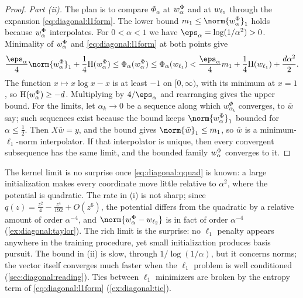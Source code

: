 \begin{refsection}
\begin{proof}
\emph{Part (ii).} The plan is to compare $\Phi_\alpha$ at $w^\Phi_\alpha$ and at $w_{\ell_{1}}$ through the expansion \eqref{eq:diagonal:l1form}. The lower bound $m_1\le\norm{\diagwphi}_1$ holds because $w^\Phi_\alpha$ interpolates. For $0<\alpha<1$ we have $\eps_\alpha=\log(1/\alpha^2)>0$. Minimality of $w^\Phi_\alpha$ and \eqref{eq:diagonal:l1form} at both points give
\[
  \frac{\eps_\alpha}4\norm{\diagwphi}_1+\frac14\diagH(\diagwphi)\le\Phi_\alpha(\diagwphi)\le\Phi_\alpha(\diagwl1)<\frac{\eps_\alpha}4m_1+\frac14\diagH(\diagwl1)+\frac{d\alpha^2}2 .
\]
The function $x\mapsto x\log x-x$ is at least $-1$ on $[0,\infty)$, with its minimum at $x=1$, so $\mathrm{H}(w^\Phi_\alpha)\ge-d$. Multiplying by $4/\eps_\alpha$ and rearranging gives the upper bound. For the limits, let $\alpha_k\to0$ be a sequence along which $w^\Phi_{\alpha_k}$ converges, to $\bar w$ say; such sequences exist because the bound keeps $\norm{\diagwphi}_1$ bounded for $\alpha\le\frac12$. Then $X\bar w=y$, and the bound gives $\norm{\bar w}_1\le m_1$, so $\bar w$ is a minimum-$\ell_1$-norm interpolator. If that interpolator is unique, then every convergent subsequence has the same limit, and the bounded family $w^\Phi_\alpha$ converges to it.
\end{proof}

The kernel limit is no surprise once \eqref{eq:diagonal:qquad} is known: a large initialization makes every coordinate move little relative to $\alpha^2$, where the potential is quadratic. The rate in (i) is not sharp; since $q(z)=\frac{z^2}4-\frac{z^4}{192}+O(z^6)$, the potential differs from the quadratic by a relative amount of order $\alpha^{-4}$, and $\norm{\diagwphi-\diagwl2}$ is in fact of order $\alpha^{-4}$ (\cref{ex:diagonal:taylor}). The rich limit is the surprise: no $\ell_1$ penalty appears anywhere in the training procedure, yet small initialization produces basis pursuit. The bound in (ii) is slow, through $1/\log(1/\alpha)$, but it concerns norms; the vector itself converges much faster when the $\ell_1$ problem is well conditioned (\cref{sec:diagonal:reading}). Ties between $\ell_1$ minimizers are broken by the entropy term of \eqref{eq:diagonal:l1form} (\cref{ex:diagonal:tie}).


\end{refsection}
